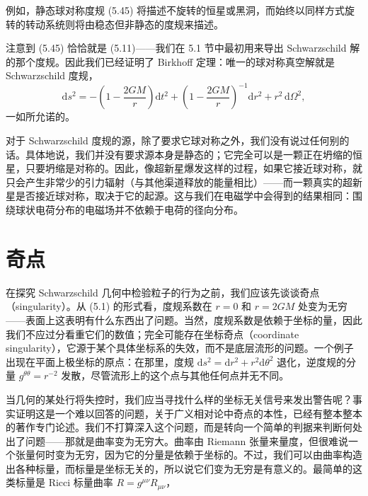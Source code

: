 例如，静态球对称度规 (5.45) 将描述不旋转的恒星或黑洞，而始终以同样方式旋转的转动系统则将由稳态但非静态的度规来描述。

注意到 (5.45) 恰恰就是 (5.11)——我们在 5.1 节中最初用来导出 Schwarzschild 解的那个度规。因此我们已经证明了 Birkhoff 定理：唯一的球对称真空解就是 Schwarzschild 度规，
\begin{equation*}
\mathrm{d}s^2 = -\left(1 - \frac{2GM}{r}\right)\mathrm{d}t^2 + \left(1 - \frac{2GM}{r}\right)^{-1}\mathrm{d}r^2 + r^2\,\mathrm{d}\Omega^2,
\tag{5.49}
\end{equation*}
一如所允诺的。

对于 Schwarzschild 度规的源，除了要求它球对称之外，我们没有说过任何别的话。具体地说，我们并没有要求源本身是静态的；它完全可以是一颗正在坍缩的恒星，只要坍缩是对称的。因此，像超新星爆发这样的过程，如果它接近球对称，就只会产生非常少的引力辐射（与其他渠道释放的能量相比）——而一颗真实的超新星是否接近球对称，取决于它的起源。这与我们在电磁学中会得到的结果相同：围绕球状电荷分布的电磁场并不依赖于电荷的径向分布。

\section{奇点}

在探究 Schwarzschild 几何中检验粒子的行为之前，我们应该先谈谈奇点（singularity）。从 (5.1) 的形式看，度规系数在 $r = 0$ 和 $r = 2GM$ 处变为无穷——表面上这表明有什么东西出了问题。当然，度规系数是依赖于坐标的量，因此我们不应过分看重它们的数值；完全可能存在坐标奇点（coordinate singularity），它源于某个具体坐标系的失效，而不是底层流形的问题。一个例子出现在平面上极坐标的原点：在那里，度规 $\mathrm{d}s^2 = \mathrm{d}r^2 + r^2\mathrm{d}\theta^2$ 退化，逆度规的分量 $g^{\theta\theta} = r^{-2}$ 发散，尽管流形上的这个点与其他任何点并无不同。

当几何的某处行将失控时，我们应当寻找什么样的坐标无关信号来发出警告呢？事实证明这是一个难以回答的问题，关于广义相对论中奇点的本性，已经有整本整本的著作专门论述。我们不打算深入这个问题，而是转向一个简单的判据来判断何处出了问题——那就是曲率变为无穷大。曲率由 Riemann 张量来量度，但很难说一个张量何时变为无穷，因为它的分量是依赖于坐标的。不过，我们可以由曲率构造出各种标量，而标量是坐标无关的，所以说它们变为无穷是有意义的。最简单的这类标量是 Ricci 标量曲率 $R = g^{\mu\nu}R_{\mu\nu}$，
